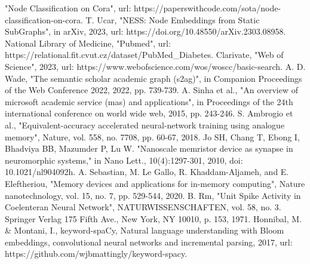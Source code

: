 \documentclass[conference]{IEEEtran}
\begin{document}
\begin{thebibliography}{00}
 "Node Classification on Cora", url: https://paperswithcode.com/sota/node-classification-on-cora.
 T. Ucar, "NESS: Node Embeddings from Static SubGraphs", in arXiv, 2023, url: https://doi.org/10.48550/arXiv.2303.08958. 
 National Library of Medicine, "Pubmed", url: https://relational.fit.cvut.cz/dataset/PubMed\_Diabetes.
 Clarivate, "Web of Science", 2023, url: https://www.webofscience.com/wos/woscc/basic-search.
 A. D. Wade, "The semantic scholar academic graph (s2ag)", in Companion Proceedings of the Web Conference 2022, 2022, pp. 739-739.
 A. Sinha et al., "An overview of microsoft academic service (mas) and applications", in Proceedings of the 24th international conference on world wide web, 2015, pp. 243-246.
 S. Ambrogio et al., "Equivalent-accuracy accelerated neural-network training using analogue memory", Nature, vol. 558, no. 7708, pp. 60-67, 2018.
 Jo SH, Chang T, Ebong I, Bhadviya BB, Mazumder P, Lu W. "Nanoscale memristor device as synapse in neuromorphic systems," in Nano Lett., 10(4):1297-301, 2010, doi: 10.1021/nl904092h.
 A. Sebastian, M. Le Gallo, R. Khaddam-Aljameh, and E. Eleftheriou, "Memory devices and applications for in-memory computing", Nature nanotechnology, vol. 15, no. 7, pp. 529-544, 2020.
 B. Rm, "Unit Spike Activity in Coelenteran Neural Network", NATURWISSENSCHAFTEN, vol. 58, no. 3. Springer Verlag 175 Fifth Ave., New York, NY 10010, p. 153, 1971.
 Honnibal, M. \& Montani, I., keyword-spaCy, Natural language understanding with Bloom embeddings, convolutional neural networks and incremental parsing, 2017, url: https://github.com/wjbmattingly/keyword-spacy.
\end{thebibliography}
\end{document}
